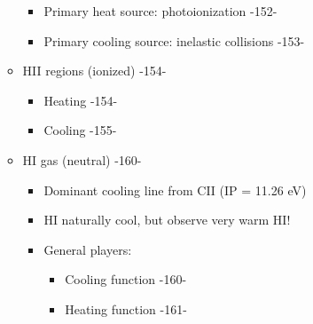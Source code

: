 \documentclass{article}
\begin{document}
\begin{enumerate}[label=\Roman*.]
\begin{itemize}
      \begin{itemize}
        \item Primary heat source: photoionization -152-
        \item Primary cooling source: inelastic collisions -153-
      \end{itemize}
      \item HII regions (ionized) -154-
      \begin{itemize}
        \item Heating -154-
        \item Cooling -155-
      \end{itemize}
      \item HI gas (neutral) -160-
      \begin{itemize}
        \item Dominant cooling line from CII (IP = 11.26 eV)
        \item HI naturally cool, but observe very warm HI!
        \item General players:
        \begin{itemize}
          \item Cooling function -160-
          \item Heating function -161-
        \end{itemize}
      \end{itemize}
    \end{itemize}
\end{enumerate}
\end{document}
